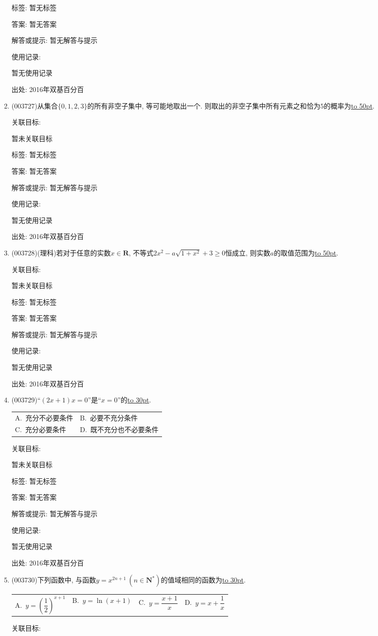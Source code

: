 \documentclass[10pt,a4paper]{article}
\newcommand{\blank}[1]{\underline{\hbox to #1pt{}}}
\newcommand{\twoch}[4]{\par\begin{tabular}{p{.46\textwidth}p{.46\textwidth}}
A.~#1& B.~#2\\
C.~#3& D.~#4
\end{tabular}}
\newcommand{\fourch}[4]{\par\begin{tabular}{p{.23\textwidth}p{.23\textwidth}p{.23\textwidth}p{.23\textwidth}}
A.~#1 &B.~#2& C.~#3& D.~#4
\end{tabular}}
\begin{document}
\begin{enumerate}[1.]
标签: 暂无标签

答案: 暂无答案

解答或提示: 暂无解答与提示

使用记录:

暂无使用记录


出处: 2016年双基百分百
\item { (003727)}从集合$\{0,1,2,3\}$的所有非空子集中, 等可能地取出一个. 则取出的非空子集中所有元素之和恰为$5$的概率为\blank{50}.


关联目标:

暂未关联目标



标签: 暂无标签

答案: 暂无答案

解答或提示: 暂无解答与提示

使用记录:

暂无使用记录


出处: 2016年双基百分百
\item { (003728)}(理科)若对于任意的实数$x\in \mathbf{R}$, 不等式$2x^2-a\sqrt{1+x^2}+3\ge 0$恒成立, 则实数$a$的取值范围为\blank{50}.


关联目标:

暂未关联目标



标签: 暂无标签

答案: 暂无答案

解答或提示: 暂无解答与提示

使用记录:

暂无使用记录


出处: 2016年双基百分百
\item { (003729)}``$(2x+1)x=0$''是``$x=0$''的\blank{30}.
\twoch{充分不必要条件}{必要不充分条件}{充分必要条件}{既不充分也不必要条件}


关联目标:

暂未关联目标



标签: 暂无标签

答案: 暂无答案

解答或提示: 暂无解答与提示

使用记录:

暂无使用记录


出处: 2016年双基百分百
\item { (003730)}下列函数中, 与函数$y=x^{2n+1} \ (n\in \mathbf{N}^*)$的值域相同的函数为\blank{30}.
\fourch{$y=\left(\dfrac 12\right)^{x+1}$}{$y=\ln(x+1)$}{$y=\dfrac{x+1}{x}$}{$y=x+\dfrac 1x$}


关联目标:


\end{enumerate}
\end{document}
